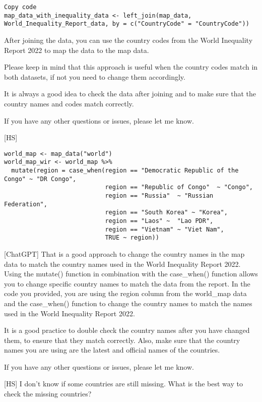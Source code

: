 \documentclass[
]{book}
\theoremstyle{definition}
\theoremstyle{definition}
\theoremstyle{definition}
\theoremstyle{definition}
\theoremstyle{remark}
\begin{document}
\begin{verbatim}
Copy code
map_data_with_inequality_data <- left_join(map_data, World_Inequality_Report_data, by = c("CountryCode" = "CountryCode"))
\end{verbatim}

After joining the data, you can use the country codes from the World Inequality Report 2022 to map the data to the map data.

Please keep in mind that this approach is useful when the country codes match in both datasets, if not you need to change them accordingly.

It is always a good idea to check the data after joining and to make sure that the country names and codes match correctly.

If you have any other questions or issues, please let me know.

{[}HS{]}

\begin{verbatim}
world_map <- map_data("world")
world_map_wir <- world_map %>% 
  mutate(region = case_when(region == "Democratic Republic of the Congo" ~ "DR Congo",
                            region == "Republic of Congo"  ~ "Congo",
                            region == "Russia"  ~ "Russian Federation",
                            region == "South Korea" ~ "Korea",
                            region == "Laos" ~  "Lao PDR",
                            region == "Vietnam" ~ "Viet Nam",
                            TRUE ~ region))
\end{verbatim}

{[}ChatGPT{]} That is a good approach to change the country names in the map data to match the country names used in the World Inequality Report 2022. Using the mutate() function in combination with the case\_when() function allows you to change specific country names to match the data from the report. In the code you provided, you are using the region column from the world\_map data and the case\_when() function to change the country names to match the names used in the World Inequality Report 2022.

It is a good practice to double check the country names after you have changed them, to ensure that they match correctly. Also, make sure that the country names you are using are the latest and official names of the countries.

If you have any other questions or issues, please let me know.

{[}HS{]} I don't know if some countries are still missing. What is the best way to check the missing countries?
\end{document}
